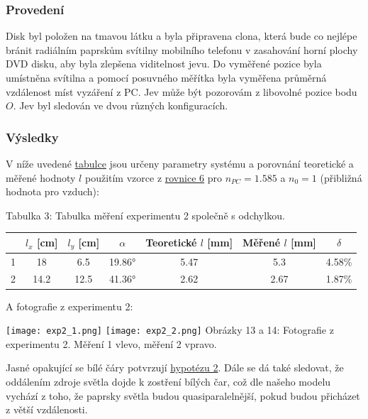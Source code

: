 \documentclass[titlepage]{article}
\begin{document}
\subsubsection{Provedení}

Disk byl položen na tmavou látku a byla připravena clona, která bude co nejlépe bránit radiálním paprskům svítilny mobilního telefonu v zasahování horní plochy DVD disku, aby byla zlepšena viditelnost jevu.
Do vyměřené pozice byla umístněna svítilna a pomocí posuvného měřítka byla vyměřena průměrná vzdálenost míst vyzáření z PC.
Jev může být pozorovám z libovolné pozice bodu $O$.
Jev byl sledován ve dvou různých konfiguracích.

\subsubsection{Výsledky}

V níže uvedené \hyperref[table:3]{tabulce} jsou určeny parametry systému a porovnání teoretické a měřené hodnoty $l$ použitím vzorce z \hyperref[eq6]{rovnice 6} pro $n_{PC} = 1.585$ \cite{index_lomu} a $n_0 = 1$ (přibližná hodnota pro vzduch):

\label{table:3}
\begin{center}
    Tabulka 3: Tabulka měření experimentu 2 společně s odchylkou. \\[3px]
    \begin{tabular}{ c | c | c || c || c | c | c }
          & $l_x$ [cm] & $l_y$ [cm] & $\alpha$ & Teoretické $l$ [mm] & Měřené $l$ [mm] & $\delta$ \\
        \hline
        1 & 18         & 6.5        & 19.86°   & 5.47                & 5.3             & 4.58\%   \\
        2 & 14.2       & 12.5       & 41.36°   & 2.62                & 2.67            & 1.87\%   \\
        \hline
    \end{tabular}
\end{center}

A fotografie z experimentu 2:

 \label{image:13}
 \label{image:14}
\begin{center}
    \texttt{[image: exp2\_1.png]}
    \texttt{[image: exp2\_2.png]}
    \linebreak
    Obrázky 13 a 14: Fotografie z experimentu 2. Měření 1 vlevo, měření 2 vpravo.
\end{center}

Jasné opakující se bílé čáry potvrzují \hyperref[hyp:2]{hypotézu 2}. Dále se dá také sledovat, že oddálením zdroje světla dojde k zostření bílých čar, což dle našeho modelu vychází z toho, že paprsky světla budou quasiparalelnější, pokud budou přicházet z větší vzdálenosti.
\end{document}
